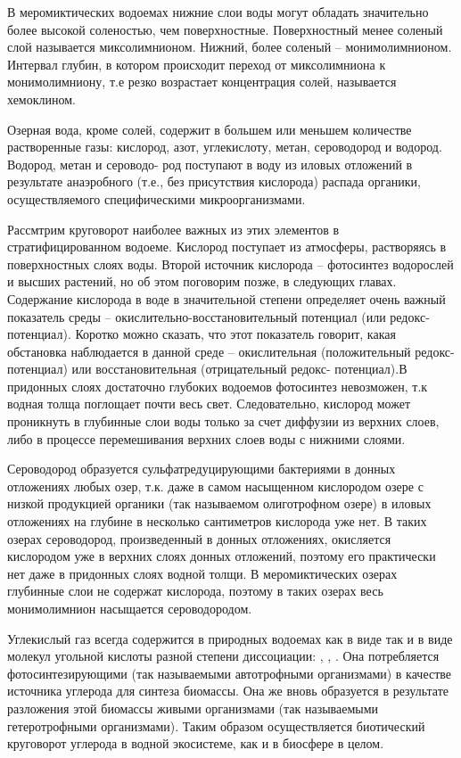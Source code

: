 В меромиктических водоемах нижние слои воды могут обладать значительно более высокой соленостью, чем поверхностные. Поверхностный менее соленый слой называется миксолимнионом. Нижний, более соленый – монимолимнионом. Интервал глубин, в котором происходит переход от миксолимниона к монимолимниону, т.е резко возрастает концентрация
солей, называется хемоклином.

Озерная вода, кроме солей, содержит в большем или меньшем количестве растворенные
газы: кислород, азот, углекислоту, метан, сероводород и водород. Водород, метан и сероводо-
род поступают в воду из иловых отложений в результате анаэробного (т.е., без присутствия
кислорода) распада органики, осуществляемого специфическими микроорганизмами.

Рассмтрим круговорот наиболее важных из этих элементов в стратифицированном водоеме. Кислород поступает из атмосферы, растворяясь в поверхностных слоях воды. Второй
источник кислорода – фотосинтез водорослей и высших растений, но об этом поговорим
позже, в следующих главах. Содержание кислорода в воде в значительной степени определяет очень важный показатель среды – окислительно-восстановительный потенциал (или
редокс-потенциал). Коротко можно сказать, что этот показатель говорит, какая обстановка
наблюдается в данной среде – окислительная (положительный редокс-потенциал) или восстановительная (отрицательный редокс- потенциал).В придонных слоях достаточно глубоких
водоемов фотосинтез невозможен, т.к водная толща поглощает почти весь свет. Следовательно, кислород может проникнуть в глубинные слои воды только за счет диффузии из верхних
слоев, либо в процессе перемешивания верхних слоев воды с нижними слоями.

Сероводород образуется сульфатредуцирующими бактериями в донных отложениях любых озер, т.к. даже в самом насыщенном кислородом озере с низкой продукцией органики
(так называемом олиготрофном озере) в иловых отложениях на глубине в несколько сантиметров кислорода уже нет. В таких озерах сероводород, произведенный в донных отложениях, окисляется кислородом уже в верхних слоях донных отложений, поэтому его практически
нет даже в придонных слоях водной толщи. В меромиктических озерах глубинные слои не
содержат кислорода, поэтому в таких озерах весь монимолимнион насыщается сероводородом.

Углекислый газ всегда содержится в природных водоемах как в виде 
так и в виде
молекул угольной кислоты разной степени диссоциации: ,  ,  .
 Она потребляется фотосинтезирующими (так называемыми автотрофными организмами) в качестве
источника углерода для синтеза биомассы. Она же вновь образуется в результате разложения этой биомассы живыми организмами (так называемыми гетеротрофными организмами).
Таким образом осуществляется биотический круговорот углерода в водной экосистеме, как
и в биосфере в целом.

